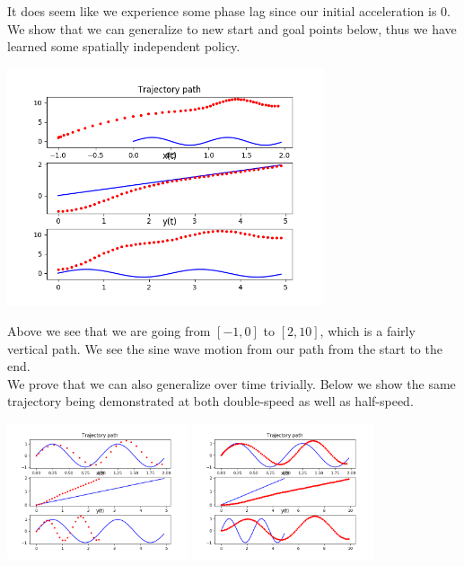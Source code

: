\documentclass[12pt]{article}
\begin{document}
It does seem like we experience some phase lag since our initial acceleration is 0.  \\

We show that we can generalize to new start and goal points below, thus we have learned some spatially independent policy.

\begin{center}
	\includegraphics[width=0.7\textwidth]{linear_generalization_spatial}
\end{center}

Above we see that we are going from $[-1, 0]$ to $[2, 10]$, which is a fairly vertical path. We see the sine wave motion from our path from the start to the end. \\

We prove that we can also generalize over time trivially. Below we show the same trajectory being demonstrated at both double-speed as well as half-speed.

\begin{center}
	\includegraphics[width=0.4\textwidth]{linear_generalization_double_speed}
	\includegraphics[width=0.4\textwidth]{linear_generalization_half_speed}
\end{center}
\end{document}
